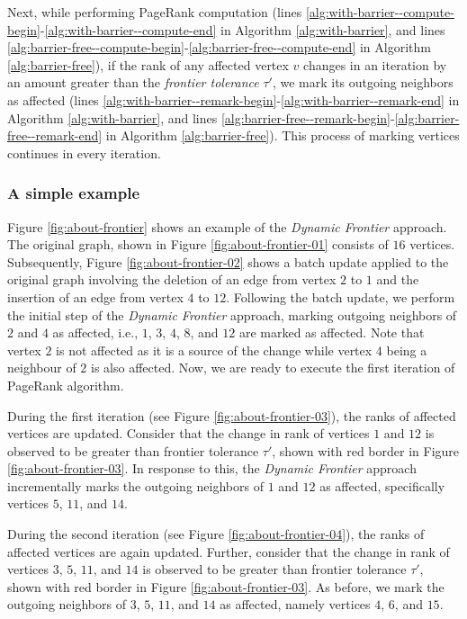 Next, while performing PageRank computation (lines \ref{alg:with-barrier--compute-begin}-\ref{alg:with-barrier--compute-end} in Algorithm \ref{alg:with-barrier}, and lines \ref{alg:barrier-free--compute-begin}-\ref{alg:barrier-free--compute-end} in Algorithm \ref{alg:barrier-free}), if the rank of any affected vertex $v$ changes in an iteration by an amount greater than the \textit{frontier tolerance} $\tau'$, we mark its outgoing neighbors as affected (lines \ref{alg:with-barrier--remark-begin}-\ref{alg:with-barrier--remark-end} in Algorithm \ref{alg:with-barrier}, and lines \ref{alg:barrier-free--remark-begin}-\ref{alg:barrier-free--remark-end} in Algorithm \ref{alg:barrier-free}). This process of marking vertices continues in every iteration.

% 
% 


\subsubsection{A simple example}

Figure \ref{fig:about-frontier} shows an example of the \textit{Dynamic Frontier} approach. The original graph, shown in Figure \ref{fig:about-frontier-01} consists of $16$ vertices. Subsequently, Figure \ref{fig:about-frontier-02} shows a batch update applied to the original graph involving the deletion of an edge from vertex $2$ to $1$ and the insertion of an edge from vertex $4$ to $12$. Following the batch update, we perform the initial step of the \textit{Dynamic Frontier} approach, marking outgoing neighbors of $2$ and $4$ as affected, i.e., $1$, $3$, $4$, $8$, and $12$ are marked as affected. Note that vertex $2$ is not affected as it is a source of the change while vertex $4$ being a neighbour of $2$ is also affected. Now, we are ready to execute the first iteration of PageRank algorithm.

During the first iteration (see Figure \ref{fig:about-frontier-03}), the ranks of affected vertices are updated. Consider that the change in rank of vertices $1$ and $12$ is observed to be greater than frontier tolerance $\tau'$, shown with red border in Figure \ref{fig:about-frontier-03}. In response to this, the \textit{Dynamic Frontier} approach incrementally marks the outgoing neighbors of $1$ and $12$ as affected, specifically vertices $5$, $11$, and $14$.

During the second iteration (see Figure \ref{fig:about-frontier-04}), the ranks of affected vertices are again updated. Further, consider that the change in rank of vertices $3$, $5$, $11$, and $14$ is observed to be greater than frontier tolerance $\tau'$, shown with red border in Figure \ref{fig:about-frontier-03}. As before, we mark the outgoing neighbors of $3$, $5$, $11$, and $14$ as affected, namely vertices $4$, $6$, and $15$.

